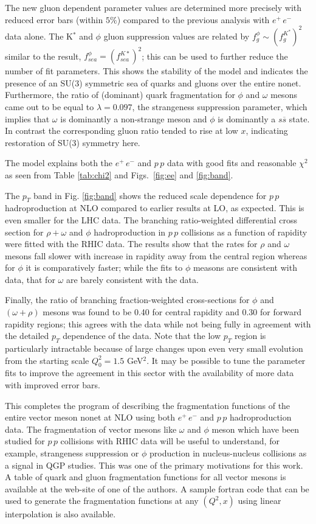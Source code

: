 \documentclass{ws-ijmpa}
\def\om{{\omega}}
\begin{document}
The new gluon dependent parameter values are determined more precisely
with reduced error bars (within $5\%$) compared to the previous analysis
with $e^+\,e^-$ data alone\cite{Savinlo}.  The K$^*$ and $\phi$ gluon
suppression values are related by $f_g^{\phi}\sim (f_g^{K^*})^2$ similar
to the result, $f_{sea}^\phi = (f_{sea}^{K*})^2$; this can be used to
further reduce the number of fit parameters. This shows the stability of
the model and indicates the presence of an SU(3) symmetric sea of quarks
and gluons over the entire nonet. Furthermore, the ratio of (dominant)
quark fragmentation for $\phi$ and $\omega$ mesons came out to be equal
to $\lambda=0.097$, the strangeness suppression parameter, which implies
that $\omega$ is dominantly a non-strange meson and $\phi$ is dominantly
a $s\overline{s}$ state. In contrast the corresponding gluon ratio tended
to rise at low $x$, indicating restoration of SU(3) symmetry here.

The model explains both the $e^+\,e^-$ and $p\,p$ data with good
fits and reasonable $\chi^2$ as seen from Table \ref{tab:chi2} and
Figs.~\ref{fig:ee} and \ref{fig:band}.

The $p_T$ band in Fig. \ref{fig:band} shows the reduced scale
dependence for $p\,p$ hadroproduction at NLO compared to earlier
results\cite{Savilo} at LO, as expected. This is even smaller for the LHC
data. The branching ratio-weighted differential
cross section for $\rho+\omega$ and $\phi$ hadroproduction in $p\,p$
collisions as a function of rapidity were fitted with the RHIC
data\cite{Ratio}. The results show that the rates for $\rho$ and
$\omega$ mesons fall slower with increase in rapidity away from the
central region whereas for $\phi$ it is comparatively faster; while the
fits to $\phi$ measons are consistent with data, that for $\omega$ are
barely consistent with the data.

Finally, the ratio of branching fraction-weighted cross-sections for
$\phi$ and $(\omega+\rho)$ mesons was found to be 0.40
for central rapidity and 0.30 for forward rapidity regions; this agrees
with the data while not being fully in agreement with the detailed $p_T$
dependence of the data. Note that the low $p_T$ region is particularly
intractable because of large changes upon even very small evolution from
the starting scale $Q_0^2 = 1.5$ GeV$^2$. It may be possible to tune the
parameter fits to improve the agreement in this sector with the
availability of more data with improved error bars.

This completes the program of describing the fragmentation functions of
the entire vector meson nonet at NLO using both $e^+\,e^-$ and $p\,p$
hadroproduction data. The fragmentation of vector mesons like $\om$
and $\phi$ meson which have been studied for $p\,p$ collisions with RHIC
data will be useful to understand, for example, strangeness suppression
or $\phi$ production in nucleus-nucleus collisions as a signal in QGP
studies. This was one of the primary motivations for this work. A
table of quark and gluon fragmentation functions for all vector mesons
is available at the web-site of one of the authors\cite{web}. A sample
fortran code that can be used to generate the fragmentation functions
at any $(Q^2, x)$ using linear interpolation is also available.
\end{document}
